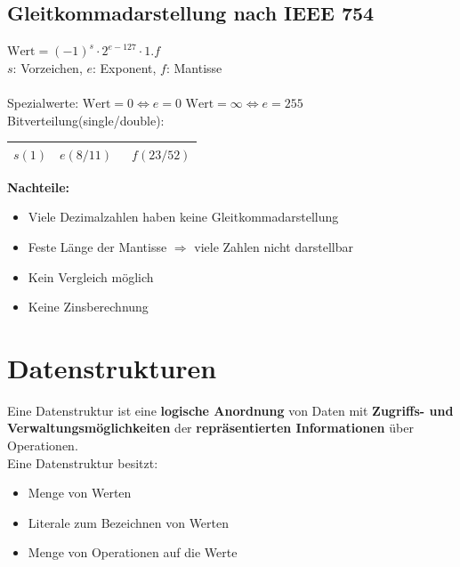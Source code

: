 \documentclass[fs, footer]{latex4ei}
\begin{document}
\begin{multicols*}{4}
	\subsection{Gleitkommadarstellung nach IEEE 754}
	$\text{Wert} = (-1)^s \cdot 2^{e-127} \cdot 1.f$\\
	$s$: Vorzeichen, $e$: Exponent, $f$: Mantisse\\ 
	\\[0.5em]
	Spezialwerte: $\text{Wert} = 0 \Leftrightarrow e=0$ \qquad $\text{Wert} = \infty \Leftrightarrow e=255$ \\
	Bitverteilung(single/double):\\
	\begin{tabular}{|c|c|c|} \hline 
		$s(1)$ & \quad $e(8/11)$ \quad\qquad & \qquad\qquad\qquad\ $f(23/52)$ \qquad\qquad\qquad\qquad \\ \hline
	\end{tabular}
	\textbf{Nachteile:}\\
	\begin{itemize}
		\item Viele Dezimalzahlen haben keine Gleitkommadarstellung
		\item Feste Länge der Mantisse $\Rightarrow$ viele Zahlen nicht darstellbar
		\item Kein Vergleich möglich
		\item Keine Zinsberechnung
	\end{itemize}
\fi

\section{Datenstrukturen}
Eine Datenstruktur ist eine \textbf{logische Anordnung} von Daten
mit \textbf{Zugriffs- und Verwaltungsmöglichkeiten} der \textbf{repräsentierten Informationen} über Operationen.\\
Eine Datenstruktur besitzt:
\begin{itemize}\itemsep0pt
	\item Menge von Werten
	\item Literale zum Bezeichnen von Werten
	\item Menge von Operationen auf die Werte
\end{itemize}


\end{multicols*}
\end{document}
